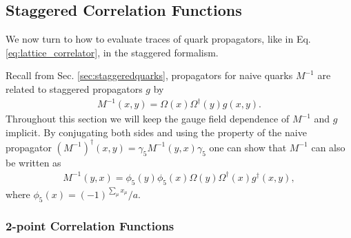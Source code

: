 \subsection{Staggered Correlation Functions}
\label{sec:staggeredcorrelators}

We now turn to how to evaluate traces of quark propagators, like in Eq. \eqref{eq:lattice_correlator}, in the staggered formalism. %

Recall from Sec. \ref{sec:staggeredquarks}, propagators for naive quarks $M^{-1}$ are related to staggered propagators $g$ by
\begin{align}
  M^{-1}(x,y) = \Omega(x)\Omega^{\dagger}(y) g(x,y).
\end{align}
Throughout this section we will keep the gauge field dependence of $M^{-1}$ and $g$ implicit. By conjugating both sides and using the property of the naive propagator $(M^{-1})^{\dagger}(x,y) = \gamma_5 M^{-1}(y,x)\gamma_5$ one can show that $M^{-1}$ can also be written as
\begin{align}
  \label{eq:Gconj}
  M^{-1}(y,x) = \phi_5(y)\phi_5(x) \Omega(y)\Omega^{\dagger}(x) g^{\dagger}(x,y),
\end{align}
where $\phi_5(x) = (-1)^{\sum_{\mu} x_{\mu}}/a$.

\subsubsection{2-point Correlation Functions}

